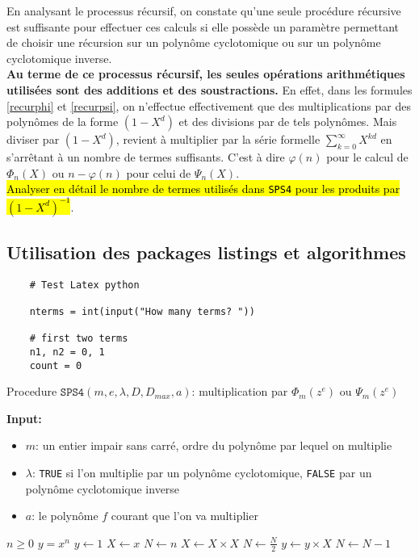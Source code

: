 \documentclass{article}
\theoremstyle{break}                  %
\begin{document}
En analysant le processus récursif, on constate qu'une seule procédure récursive est suffisante pour effectuer ces calculs si elle possède un paramètre permettant de choisir une récursion sur un polynôme cyclotomique ou sur un polynôme cyclotomique inverse. \\

\textbf{Au terme de ce processus récursif, les seules opérations arithmétiques utilisées sont des additions et des soustractions.} En effet, dans les formules \ref{recurphi} et \ref{recurpsi}, on n'effectue effectivement que des multiplications par des polynômes de la forme $(1-X^d)$ et des divisions par de tels polynômes. Mais diviser par $(1-X^d)$, revient à multiplier par la série formelle $\displaystyle \sum_{k = 0}^\infty X^{kd}$ en s'arrêtant à un nombre de termes suffisants. C'est à dire $\varphi(n)$ pour le calcul de $\Phi_n(X)$ ou $n - \varphi(n)$ pour celui de $\Psi_n(X)$.\\



\hl{Analyser en détail le nombre de termes utilisés dans \texttt{SPS4} pour les produits par $(1-X^d)^{-1}$}.\\

\subsection*{Utilisation des packages listings et algorithmes}
\begin{lstlisting}
	# Test Latex python
	
	nterms = int(input("How many terms? "))
	
	# first two terms
	n1, n2 = 0, 1
	count = 0
\end{lstlisting}

\begin{algorithm}
	\caption{Procedure $\texttt{SPS4}(m, e, \lambda, D, D_{max}, a)$: multiplication par $\Phi_m(z^e)$ ou $\Psi_m(z^e)$ }\label{alg:cap} 
	\textbf{Input:}
	\begin{itemize}
		\item $m$: un entier impair sans carré, ordre du polynôme par lequel on multiplie
		\item $\lambda$: \texttt{TRUE} si l'on multiplie par un polynôme cyclotomique, \texttt{FALSE} par un polynôme cyclotomique inverse
		\item $a$: le polynôme $f$ courant que l'on va multiplier 
	\end{itemize}
	\begin{algorithmic}
		\Require $n \geq 0$
		\Ensure $y = x^n$
		\State $y \gets 1$
		\State $X \gets x$
		\State $N \gets n$
		\State $X \gets X \times X$
		\State $N \gets \frac{N}{2}$  
		\State $y \gets y \times X$
		\State $N \gets N - 1$
		\EndIf
		\EndWhile
	\end{algorithmic}
\end{algorithm}
\end{document}
